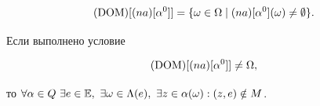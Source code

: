 \begin{equation}\label{3.56}


(\DOM)[(na)[{\alpha}^0]] = \{\omega \in \Om \mid


(na)[{\alpha}^0](\omega) \ne \emp\}.


\end{equation}








\begin{props}


Если выполнено условие


\begin{equation}\label{3.57}


(\DOM)[(na)[{\alpha}^0]] \ne \Om,


\end{equation}


то $\fo{\alpha} \in Q \ \exi{e} \in \Bbb{E}, \ \exi{\omega} \in


{{\Ld}(e)}, \ \exi{z} \in {{\alpha}(\omega)}:(z,e) \notin M$.


\end{props}








